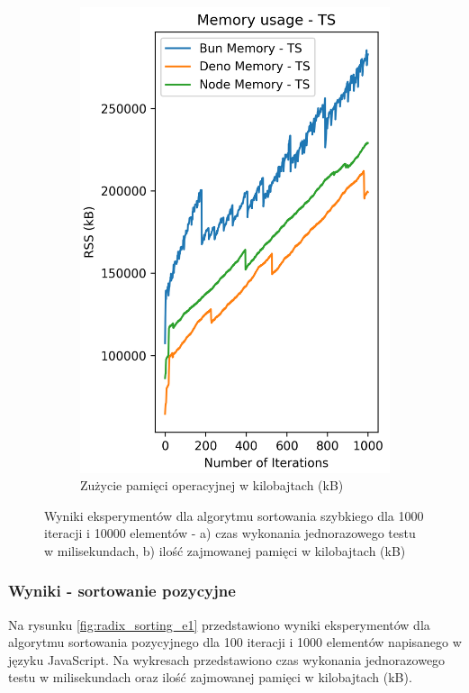 \begin{figure}[H]
\begin{subfigure}[b]{0.42\textwidth}
    \includegraphics[width=\textwidth]{Figures/sorting/sorting_quick_1000_10000_ts_memory.png}
    \caption{Zużycie pamięci operacyjnej w kilobajtach (kB)}
    \label{fig:quick_sorting_e4_ts_memory}
  \end{subfigure}
  \caption{Wyniki eksperymentów dla algorytmu sortowania szybkiego dla 1000 iteracji i 10000 elementów - a) czas wykonania jednorazowego testu w milisekundach, b) ilość zajmowanej pamięci w kilobajtach (kB)}
  \label{fig:quick_sorting_e4_ts}
\end{figure}

\subsubsection{Wyniki - sortowanie pozycyjne}
Na rysunku \ref{fig:radix_sorting_e1} przedstawiono wyniki eksperymentów dla algorytmu sortowania pozycyjnego dla 100 iteracji i 1000 elementów napisanego w języku JavaScript. Na wykresach przedstawiono czas wykonania jednorazowego testu w milisekundach oraz ilość zajmowanej pamięci w kilobajtach (kB).

